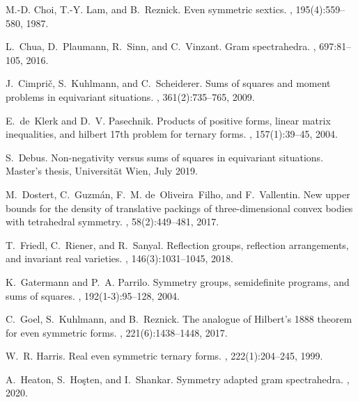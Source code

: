 \documentclass[11pt,a4paper]{amsart}
\numberwithin{equation}{section}
\theoremstyle{definition}
\numberwithin{thm}{section}
\theoremstyle{break}
\numberwithin{subcase}{case}
\begin{document}
\begin{thebibliography}{10}
M.-D. Choi, T.-Y. Lam, and B.~Reznick.
\newblock Even symmetric sextics.
, 195(4):559--580, 1987.

L.~Chua, D.~Plaumann, R.~Sinn, and C.~Vinzant.
\newblock Gram spectrahedra.
, 697:81--105,
  2016.

J.~Cimpri{\v{c}}, S.~Kuhlmann, and C.~Scheiderer.
\newblock Sums of squares and moment problems in equivariant situations.
,
  361(2):735--765, 2009.

E.~de~Klerk and D.~V. Pasechnik.
\newblock Products of positive forms, linear matrix inequalities, and hilbert
  17th problem for ternary forms.
, 157(1):39--45, 2004.

S.~Debus.
\newblock Non-negativity versus sums of squares in equivariant situations.
\newblock Master's thesis, Universit\"at Wien, July 2019.

M.~Dostert, C.~Guzm{\'a}n, F.~M. de~Oliveira~Filho, and F.~Vallentin.
\newblock New upper bounds for the density of translative packings of
  three-dimensional convex bodies with tetrahedral symmetry.
, 58(2):449--481, 2017.

T.~Friedl, C.~Riener, and R.~Sanyal.
\newblock Reflection groups, reflection arrangements, and invariant real
  varieties.
,
  146(3):1031--1045, 2018.

K.~Gatermann and P.~A. Parrilo.
\newblock Symmetry groups, semidefinite programs, and sums of squares.
, 192(1-3):95--128, 2004.

C.~Goel, S.~Kuhlmann, and B.~Reznick.
\newblock The analogue of Hilbert's 1888 theorem for even symmetric forms.
, 221(6):1438--1448, 2017.

W.~R. Harris.
\newblock Real even symmetric ternary forms.
, 222(1):204--245, 1999.

A.~Heaton, S.~Ho{\c{s}}ten, and I.~Shankar.
\newblock Symmetry adapted gram spectrahedra.
, 2020.


\end{thebibliography}
\end{document}
